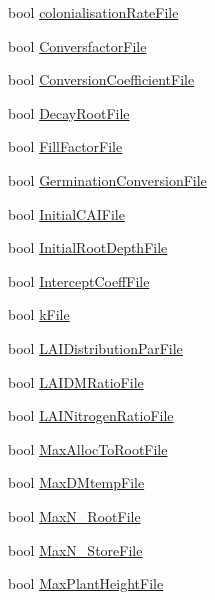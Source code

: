 \begin{DoxyCompactItemize}
\item 
bool \hyperlink{classcrop_parameters_crop_adf6f0e50fc09e2c4cbce003a12159660}{colonialisationRateFile}
\item 
bool \hyperlink{classcrop_parameters_crop_a2f8cd90d7c5b120e6999da7b1d70d1ce}{ConversfactorFile}
\item 
bool \hyperlink{classcrop_parameters_crop_ae30d9d37fb0a7a5c04c381caefd24225}{ConversionCoefficientFile}
\item 
bool \hyperlink{classcrop_parameters_crop_ac0c276992fb4eb39429772111deddc99}{DecayRootFile}
\item 
bool \hyperlink{classcrop_parameters_crop_adf6d0705fc19d9e57269a2f0901b5702}{FillFactorFile}
\item 
bool \hyperlink{classcrop_parameters_crop_a5b070c1db8e629d0f02962b095e037ad}{GerminationConversionFile}
\item 
bool \hyperlink{classcrop_parameters_crop_a68da2b65e5816d582946dac2aa03b3e3}{InitialCAIFile}
\item 
bool \hyperlink{classcrop_parameters_crop_af752d06eed4ea6ec2c09b0bfa6ffaef1}{InitialRootDepthFile}
\item 
bool \hyperlink{classcrop_parameters_crop_a45acec28bed68dac31a7320873f27324}{InterceptCoeffFile}
\item 
bool \hyperlink{classcrop_parameters_crop_abfb6f718a8331150fec02d6da8197294}{kFile}
\item 
bool \hyperlink{classcrop_parameters_crop_a0266b99668352e726712a4edc7caa234}{LAIDistributionParFile}
\item 
bool \hyperlink{classcrop_parameters_crop_abf6ddcc70203f9c5df01035b7db495f2}{LAIDMRatioFile}
\item 
bool \hyperlink{classcrop_parameters_crop_a4341004a03fe811c527c9eda8921f198}{LAINitrogenRatioFile}
\item 
bool \hyperlink{classcrop_parameters_crop_a40fb2f1f4329318b387dca856a4e2f1b}{MaxAllocToRootFile}
\item 
bool \hyperlink{classcrop_parameters_crop_af8b37e659e9a6e8be28b99d7e0b6cc1c}{MaxDMtempFile}
\item 
bool \hyperlink{classcrop_parameters_crop_a0429ac721f4ed8f1870ba337c85f4e45}{MaxN\_\-RootFile}
\item 
bool \hyperlink{classcrop_parameters_crop_aa8260b0a6d092bc52f789e21cd2f1eea}{MaxN\_\-StoreFile}
\item 
bool \hyperlink{classcrop_parameters_crop_a85ff538f4832d5026cd25c561ab211e4}{MaxPlantHeightFile}
\item 

\end{DoxyCompactItemize}
